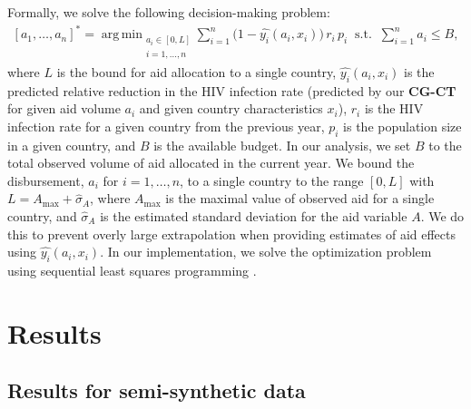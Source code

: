 \documentclass[sigconf]{acmart}
\DeclareMathOperator*{\argmin}{arg\,min} %
\newcommand{\framework}{\textbf{\mbox{CG-CT}}\xspace}
\begin{document}
Formally, we solve the following decision-making problem:
\begin{align}
\label{eq:opt_alloc}
[a_1, \ldots, a_n ]^*  = \argmin_{\substack{a_i \in [0, L]\\ i = 1, \ldots, n}} & \sum_{i=1}^n \big(1-\hat{y_i}(a_i, x_i)\big) \, r_i  \, p_i \;\;
 \mathrm{s.t.} \;\; \sum_{i=1}^n a_i \leq B    \nonumber, 
\end{align}
where $L$ is the bound for aid allocation to a single country, $\hat{y_i}(a_i, x_i)$ is the predicted relative reduction in the HIV infection rate (predicted by our \framework for given aid volume $a_i$ and given country characteristics $x_i$), $r_i$ is the HIV infection rate for a given country from the previous year, $p_i$ is the population size in a given country, and $B$ is the available budget. In our analysis, we set $B$ to the total observed volume of aid allocated in the current year. We bound the disbursement, $a_i$ for $i = 1, \ldots, n$, to a single country to the range $[0, L]$ with $L = A_{\mathrm{max}}+\hat{\sigma}_{A}$, where $A_{\mathrm{max}}$ is the maximal value of observed aid for a single country, and $\hat{\sigma}_{A}$ is the estimated standard deviation for the aid variable $A$. We do this to prevent overly large extrapolation when providing estimates of aid effects using $\hat{y_i}(a_i, x_i)$. In our implementation, we solve the optimization problem using sequential least squares programming \cite{Kraft1988}.



\section{Results}

\subsection{Results for semi-synthetic data}

\end{document}
